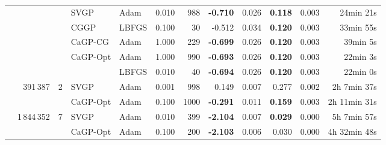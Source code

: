 \begin{tabular}{lrrllrrrrrrr}
 &  &  & \textcolor{SVGP}{SVGP} & Adam & 0.010 & 988 & \textcolor{SVGP}{\bfseries-0.710} & 0.026 & \textcolor{SVGP}{\bfseries0.118} & 0.003 & 24min 21s\\
 &  &  &  \textcolor{CGGP}{CGGP} & LBFGS & 0.100 & 30 & -0.512 & 0.034 & \textcolor{CGGP}{\bfseries0.120} & 0.003 & 33min 55s \\
 &  &  & \textcolor{CaGP-CG}{CaGP-CG} & Adam & 1.000 & 229 & \textcolor{CaGP-CG}{\bfseries-0.699} & 0.026 & \textcolor{CaGP-CG}{\bfseries0.120} & 0.003 & 39min \phantom{0}5s\\
 &  &  & \multirow[t]{2}{*}{\textcolor{CaGP-Opt}{CaGP-Opt}} & Adam & 1.000 & 990 & \textcolor{CaGP-Opt}{\bfseries-0.693} & 0.026 & \textcolor{CaGP-Opt}{\bfseries0.120} & 0.003 & 22min \phantom{0}3s\\
 &  &  &  & LBFGS & 0.010 & 40 & \textcolor{CaGP-Opt}{\bfseries-0.694} & 0.026 & \textcolor{CaGP-Opt}{\bfseries0.120} & 0.003 & 22min \phantom{0}0s\\
 \arrayrulecolor{lightgray}\cmidrule(lr){1-12}
 \multirow[t]{2}{*}{Road \citep{Kaul2013RoadNetwork}} & \multirow[t]{2}{*}{391\,387} & \multirow[t]{2}{*}{2} & \textcolor{SVGP}{SVGP} & Adam & 0.001 & 998 & 0.149 & 0.007 & 0.277 & 0.002 & 2h \phantom{0}7min 37s\\
 &  &  & \textcolor{CaGP-Opt}{CaGP-Opt} & Adam & 0.100 & 1000 & \textcolor{CaGP-Opt}{\bfseries-0.291} & 0.011 & \textcolor{CaGP-Opt}{\bfseries0.159} & 0.003 & 2h 11min 31s\\
 \arrayrulecolor{lightgray}\cmidrule(lr){1-12}
 \multirow[t]{2}{*}{Power \citep{Hebrail2006IndividualHousehold}} & \multirow[t]{2}{*}{1\,844\,352} & \multirow[t]{2}{*}{7} & \textcolor{SVGP}{SVGP} & Adam & 0.010 & 399 & \textcolor{SVGP}{\bfseries-2.104} & 0.007 & \textcolor{SVGP}{\bfseries0.029} & 0.000 & 5h \phantom{0}7min 57s\\
 &  &  & \textcolor{CaGP-Opt}{CaGP-Opt} & Adam & 0.100 & 200 & \textcolor{CaGP-Opt}{\bfseries-2.103} & 0.006 & 0.030 & 0.000 & 4h 32min 48s\\
\bottomrule
\end{tabular}

